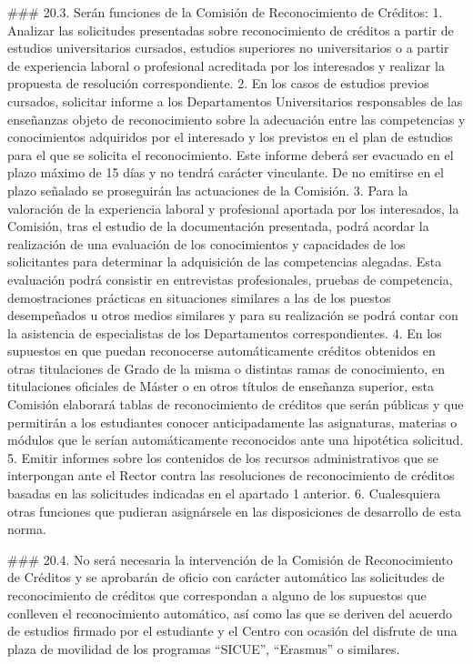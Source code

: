 \documentclass{article}
\begin{document}
\begin{itemize}
\begin{itemize}
\begin{scriptsize}
                  \#\#\# 20.3.
                  Serán funciones de la Comisión de Reconocimiento de Créditos:
                  1. Analizar las solicitudes presentadas sobre reconocimiento de créditos a partir de estudios universitarios cursados, estudios superiores no universitarios o a partir de experiencia laboral o profesional acreditada por los interesados y realizar la propuesta de resolución correspondiente.
                  2. En los casos de estudios previos cursados, solicitar informe a los Departamentos Universitarios responsables de las enseñanzas objeto de reconocimiento sobre la adecuación entre las competencias y conocimientos adquiridos por el interesado y los previstos en el plan de estudios para el que se solicita el reconocimiento. Este informe deberá ser evacuado en el plazo máximo de 15 días y no tendrá carácter vinculante. De no emitirse en el plazo señalado se proseguirán las actuaciones de la Comisión.
                  3. Para la valoración de la experiencia laboral y profesional aportada por los interesados, la Comisión, tras el estudio de la documentación presentada, podrá acordar la realización de una evaluación de los conocimientos y capacidades de los solicitantes para determinar la adquisición de las competencias alegadas. Esta evaluación podrá consistir en entrevistas profesionales, pruebas de competencia, demostraciones prácticas en situaciones similares a las de los puestos desempeñados u otros medios similares y para su realización se podrá contar con la asistencia de especialistas de los Departamentos correspondientes.
                  4. En los supuestos en que puedan reconocerse automáticamente créditos obtenidos en otras titulaciones de Grado de la misma o distintas ramas de conocimiento, en titulaciones oficiales de Máster o en otros títulos de enseñanza superior, esta Comisión elaborará tablas de reconocimiento de créditos que serán públicas y que permitirán a los estudiantes conocer anticipadamente las asignaturas, materias o módulos que le serían automáticamente reconocidos ante una hipotética solicitud.
                  5. Emitir informes sobre los contenidos de los recursos administrativos que se interpongan ante el Rector contra las resoluciones de reconocimiento de créditos basadas en las solicitudes indicadas en el apartado 1 anterior.
                  6. Cualesquiera otras funciones que pudieran asignársele en las disposiciones de desarrollo de esta norma.

                  \#\#\# 20.4.
                  No será necesaria la intervención de la Comisión de Reconocimiento de Créditos y se aprobarán de oficio con carácter automático las solicitudes de reconocimiento de créditos que correspondan a alguno de los supuestos que conlleven el reconocimiento automático, así como las que se deriven del acuerdo de estudios firmado por el estudiante y el Centro con ocasión del disfrute de una plaza de movilidad de los programas “SICUE”, “Erasmus” o similares.


\end{scriptsize}
\end{itemize}
\end{itemize}
\end{document}
